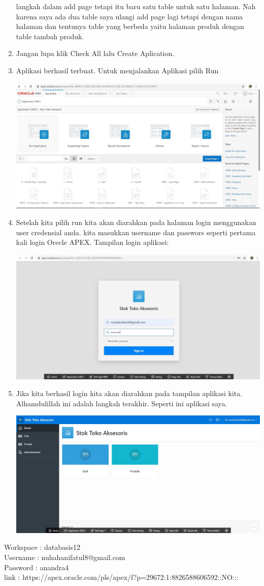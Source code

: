 \documentclass[a4paper,12pt]{report}
\begin{document}
\begin{enumerate}
\begin{center}
    \end{center}
    langkah dalam add page tetapi itu baru satu table untuk satu halaman. Nah karena saya ada dua table saya ulangi add page lagi tetapi dengan nama halaman dan tentunya table yang berbeda yaitu halaman produk dengan table tambah produk.
    \item Jangan lupa klik Check All lalu Create Aplication.
    \item Aplikasi berhasil terbuat. Untuk menjalankan Aplikasi pilih Run
    \begin{center}
    \includegraphics[width=11cm\textwidth]{figure/run.jpg}
    \end{center}
    \item Setelah kita pilih run kita akan diarahkan pada halaman login menggunakan user credensial anda. kita masukkan username dan passwors seperti pertama kali login Orecle APEX. Tampilan login aplikasi:
    \begin{center}
    \includegraphics[width=11cm\textwidth]{figure/logins.jpg}
    \end{center}
    \item Jika kita berhasil login kita akan diarahkan pada tampilan aplikasi kita. Alhamdulillah ini adalah langkah terakhir. Seperti ini aplikasi saya.
    \begin{center}
    \includegraphics[width=11cm\textwidth]{figure/Stok Toko Aksesoris.jpg}
    \end{center}
\end{enumerate}
Workspace : databasis12 \\
Username : nuhahanifatul8@gmail.com \\
Password : anandra4 \\
link : https://apex.oracle.com/pls/apex/f?p=29672:1:8826588606592::NO:::
\end{document}

